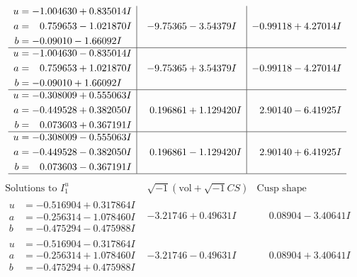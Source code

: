 \documentclass[1p]{elsarticle_modified}
\theoremstyle{definition}
\newcommand{\I}{\sqrt{-1}}
\begin{document}
$$\begin{array}{c|c|c}
\begin{aligned}
u &= -1.004630 + 0.835014 I \\
a &= \phantom{-}0.759653 - 1.021870 I \\
b &= -0.09010 - 1.66092 I\end{aligned}
 & -9.75365 - 3.54379 I & -0.99118 + 4.27014 I \\ \hline\begin{aligned}
u &= -1.004630 - 0.835014 I \\
a &= \phantom{-}0.759653 + 1.021870 I \\
b &= -0.09010 + 1.66092 I\end{aligned}
 & -9.75365 + 3.54379 I & -0.99118 - 4.27014 I \\ \hline\begin{aligned}
u &= -0.308009 + 0.555063 I \\
a &= -0.449528 + 0.382050 I \\
b &= \phantom{-}0.073603 + 0.367191 I\end{aligned}
 & \phantom{-}0.196861 + 1.129420 I & \phantom{-}2.90140 - 6.41925 I \\ \hline\begin{aligned}
u &= -0.308009 - 0.555063 I \\
a &= -0.449528 - 0.382050 I \\
b &= \phantom{-}0.073603 - 0.367191 I\end{aligned}
 & \phantom{-}0.196861 - 1.129420 I & \phantom{-}2.90140 + 6.41925 I\\
 \hline 
 \end{array}$$\newpage$$\begin{array}{c|c|c}  
\text{Solutions to }I^u_{1}& \I (\text{vol} + \sqrt{-1}CS) & \text{Cusp shape}\\
 \hline 
\begin{aligned}
u &= -0.516904 + 0.317864 I \\
a &= -0.256314 - 1.078460 I \\
b &= -0.475294 - 0.475988 I\end{aligned}
 & -3.21746 + 0.49631 I & \phantom{-}0.08904 - 3.40641 I \\ \hline\begin{aligned}
u &= -0.516904 - 0.317864 I \\
a &= -0.256314 + 1.078460 I \\
b &= -0.475294 + 0.475988 I\end{aligned}
 & -3.21746 - 0.49631 I & \phantom{-}0.08904 + 3.40641 I \\ \hline\begin{aligned}

\end{aligned}
\end{array}$$
\end{document}
